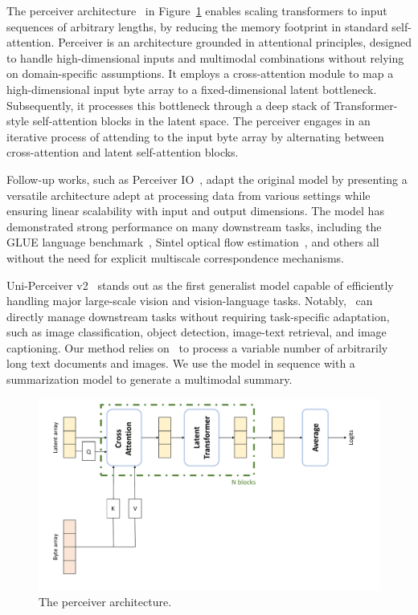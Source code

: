 The perceiver architecture~\cite{jaegle2021perceiver} in Figure~\ref{fig:perceiver} enables scaling transformers to input sequences of arbitrary lengths, by reducing the memory footprint in standard self-attention. Perceiver is an architecture grounded in attentional principles, designed to handle high-dimensional inputs and multimodal combinations without relying on domain-specific assumptions. It employs a cross-attention module to map a high-dimensional input byte array to a fixed-dimensional latent bottleneck. Subsequently, it processes this bottleneck through a deep stack of Transformer-style self-attention blocks in the latent space. The perceiver engages in an iterative process of attending to the input byte array by alternating between cross-attention and latent self-attention blocks.

Follow-up works, such as Perceiver IO~\cite{jaegle2022perceiver}, adapt the original model by presenting a versatile architecture adept at processing data from various settings while ensuring linear scalability with input and output dimensions. The model has demonstrated strong performance on many downstream tasks, including the GLUE language benchmark~\cite{wang2019glue}, Sintel optical flow estimation~\cite{Butler:ECCV:2012}, and others all without the need for explicit multiscale correspondence mechanisms. 

Uni-Perceiver v2~\cite{Li_2023_CVPR} stands out as the first generalist model capable of efficiently handling major large-scale vision and vision-language tasks. Notably,~\citet{Li_2023_CVPR} can directly manage downstream tasks without requiring task-specific adaptation, such as image classification, object detection, image-text retrieval, and image captioning. Our method relies on~\citet{Li_2023_CVPR} to process a variable number of arbitrarily long text documents and images. We use the model in sequence with a summarization model to generate a multimodal summary.

\begin{figure}
\centering\includegraphics[width=\textwidth,height=\textwidth,keepaspectratio]{images/perceiver.pdf}
  \caption{The perceiver architecture.}
  \label{fig:perceiver}
\end{figure}

